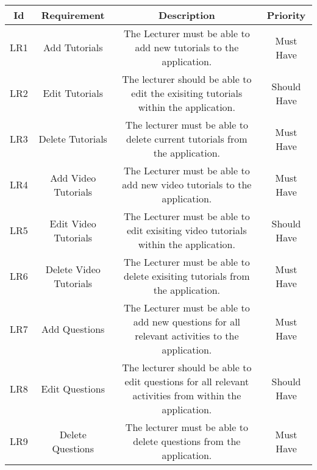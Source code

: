 \documentclass{article}
\begin{document}
\begin{tabular}{cccc}
\hline \textbf{Id} & \textbf{Requirement} & \textbf{Description} & \textbf{Priority}\\
\hline
LR1 & \multicolumn{1}{m{4cm}}{Add Tutorials} & \multicolumn{1}{m{8cm}}{The Lecturer must be able to add new tutorials to the application.} & Must Have\\
LR2 & \multicolumn{1}{m{4cm}}{Edit Tutorials} & \multicolumn{1}{m{8cm}}{The lecturer should be able to edit the exisiting tutorials within the application.} & Should Have\\
LR3 & \multicolumn{1}{m{4cm}}{Delete Tutorials} & \multicolumn{1}{m{8cm}}{The lecturer must be able to delete current tutorials from the application.} & Must Have\\
LR4 & \multicolumn{1}{m{4cm}}{Add Video Tutorials} & \multicolumn{1}{m{8cm}}{The Lecturer must be able to add new video tutorials to the application.} & Must Have\\
LR5 & \multicolumn{1}{m{4cm}}{Edit Video Tutorials} & \multicolumn{1}{m{8cm}}{The Lecturer must be able to edit exisiting video tutorials within the application.} & Should Have\\
LR6 & \multicolumn{1}{m{4cm}}{Delete Video Tutorials} & \multicolumn{1}{m{8cm}}{The Lecturer must be able to delete exisiting tutorials from the application.} & Must Have\\
LR7 & \multicolumn{1}{m{4cm}}{Add Questions} & \multicolumn{1}{m{8cm}}{The Lecturer must be able to add new questions for all relevant activities to the application.} & Must Have\\
LR8 & \multicolumn{1}{m{4cm}}{Edit Questions} & \multicolumn{1}{m{8cm}}{The lecturer should be able to edit questions for all relevant activities from within the application.} & Should Have\\
LR9 & \multicolumn{1}{m{4cm}}{Delete Questions} & \multicolumn{1}{m{8cm}}{The lecturer must be able to delete questions from the application.} & Must Have\\
\hline 
\end{tabular}
\end{document}
